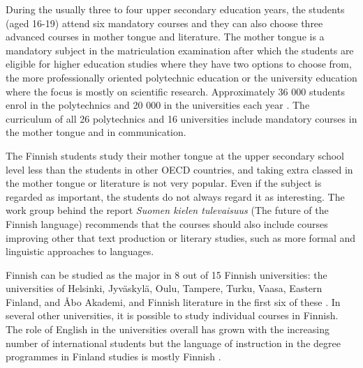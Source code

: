 \documentclass[]{../../metanetpaper}
\begin{document}
\begin{Parallel}[c]{77mm}{77mm}
{During the usually three to four upper secondary education years, the
students (aged 16-19) attend six mandatory courses and they can also
choose three advanced courses in mother tongue and literature. The
mother tongue is a mandatory subject in the matriculation examination
after which the students are eligible for higher education studies
where they have two options to choose from, the more professionally
oriented polytechnic education or the university education where the
focus is mostly on scientific research. Approximately 36 000 students
enrol in the polytechnics and 20 000 in the universities each year
\cite{Education}. The curriculum of all 26 polytechnics and 16
universities include mandatory courses in the mother tongue and in
communication.

The Finnish students study their mother tongue at the upper secondary
school level less than the students in other OECD countries, and
taking extra classed in the mother tongue or literature is not very
popular. Even if the subject is regarded as important, the students do
not always regard it as interesting. The work group behind the report
\textit{\foreignlanguage{finnish}{Suomen kielen tulevaisuus}} (The
future of the Finnish language) \cite{Tulevaisuus2009} recommends that
the courses should also include courses improving other that text
production or literary studies, such as more formal and linguistic
approaches to languages.

Finnish can be studied as the major in 8 out of 15 Finnish
universities: the universities of Helsinki, Jyväskylä, Oulu, Tampere,
Turku, Vaasa, Eastern Finland, and Åbo Akademi, and Finnish literature
in the first six of these \cite{hum-ulko}. In several other
universities, it is possible to study individual courses in
Finnish. The role of English in the universities overall has grown
with the increasing number of international students but the language
of instruction in the degree programmes in Finland studies is mostly
Finnish \cite{Board}.
}

\ParallelPar


\end{Parallel}
\end{document}
